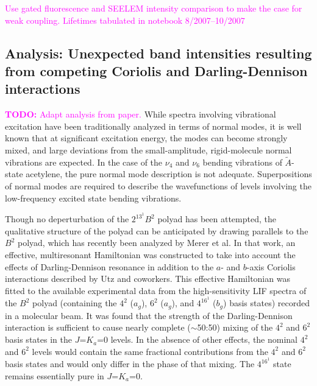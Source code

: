 \documentclass[12pt,draft]{mitthesis}
\newcommand{\TODO} [1]{\textcolor{magenta}{\textbf{TODO:} #1}}
\newcommand{\POINT}[1]{\textcolor{magenta}{#1}}
\begin{document}
\POINT{Use gated fluorescence and SEELEM intensity comparison to make
  the case for weak coupling. Lifetimes tabulated in notebook
  8/2007--10/2007}


\subsection{Analysis: Unexpected band intensities resulting from
  competing Coriolis and Darling-Dennison interactions}

\TODO{Adapt analysis from paper.}  While spectra involving vibrational
excitation have been traditionally analyzed in terms of normal modes,
it is well known that at significant excitation energy, the modes can
become strongly mixed, and large deviations from the small-amplitude,
rigid-molecule normal vibrations are expected.  In the case of the
$\nu_4$ and $\nu_6$ bending vibrations of $\tilde{A}$-state acetylene,
the pure normal mode description is not adequate. Superpositions of
normal modes are required to describe the wavefunctions of levels
involving the low-frequency excited state bending vibrations.

Though no deperturbation of the $2^13^1B^2$ polyad has been attempted,
the qualitative structure of the polyad can be anticipated by drawing
parallels to the $B^2$ polyad, which has recently been analyzed by
Merer et al.  In that work, an effective, multiresonant Hamiltonian
was constructed to take into account the effects of Darling-Dennison
resonance in addition to the $a$- and $b$-axis Coriolis interactions
described by Utz and coworkers.  This effective Hamiltonian was fitted
to the available experimental data from the high-sensitivity LIF
spectra of the $B^2$ polyad (containing the $4^2$ ($a_g$), $6^2$
($a_g$), and $4^16^1$ ($b_g$) basis states) recorded in a molecular
beam. It was found that the strength of the Darling-Dennison
interaction is sufficient to cause nearly complete ($\sim$50:50)
mixing of the $4^2$ and $6^2$ basis states in the $J$=$K_a$=0
levels. In the absence of other effects, the nominal $4^2$ and $6^2$
levels would contain the same fractional contributions from the $4^2$
and $6^2$ basis states and would only differ in the phase of that
mixing.  The $4^16^1$ state remains essentially pure in $J$=$K_a$=0.
\end{document}
